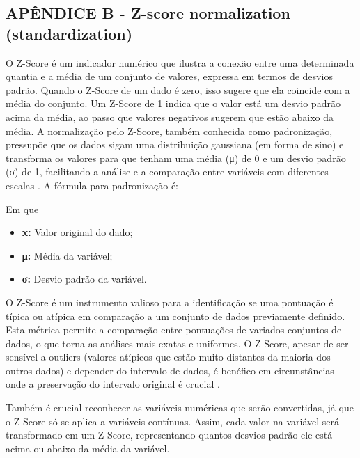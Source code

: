 \begin{apendicesenv}
\chapter{APÊNDICE B - Z-score normalization (standardization)}

O Z-Score é um indicador numérico que ilustra a conexão entre uma determinada quantia e a média de um conjunto de valores, expressa em termos de desvios padrão. Quando o Z-Score de um dado é zero, isso sugere que ela coincide com a média do conjunto. Um Z-Score de 1 indica que o valor está um desvio padrão acima da média, ao passo que valores negativos sugerem que estão abaixo da média. A normalização pelo Z-Score, também conhecida como padronização, pressupõe que os dados sigam uma distribuição gaussiana (em forma de sino) e transforma os valores para que tenham uma média (μ) de 0 e um desvio padrão (σ) de 1, facilitando a análise e a comparação entre variáveis com diferentes escalas \cite{jaiswal2024; maiseretorno2022}. A fórmula para padronização é:



%     

Em que
\begin{itemize}
  \item \textbf{x:} Valor original do dado;
  \item \textbf{μ:} Média da variável;
  \item \textbf{σ:} Desvio padrão da variável.
\end{itemize}

O Z-Score é um instrumento valioso para a identificação se uma pontuação é típica ou atípica em comparação a um conjunto de dados previamente definido. Esta métrica permite a comparação entre pontuações de variados conjuntos de dados, o que torna as análises mais exatas e uniformes. O Z-Score, apesar de ser sensível a outliers (valores atípicos que estão muito distantes da maioria dos outros dados) e depender do intervalo de dados, é benéfico em circunstâncias onde a preservação do intervalo original é crucial \cite{sousa2019; maiseretorno2022}.

Também é crucial reconhecer as variáveis numéricas que serão convertidas, já que o Z-Score só se aplica a variáveis contínuas. Assim, cada valor na variável será transformado em um Z-Score, representando quantos desvios padrão ele está acima ou abaixo da média da variável. 


\end{apendicesenv}

